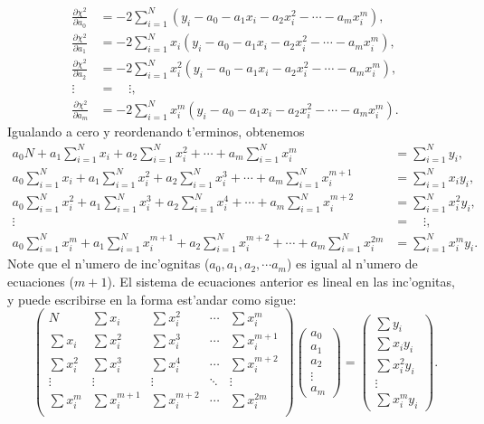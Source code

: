 \documentclass[a4paper]{report}
\begin{document}
\begin{align}
\frac{\partial\chi^2}{\partial a_0} &= -2\sum_{i=1}^N \left(y_i-a_0-a_1x_i-a_2x_i^2-\cdots -a_mx_i^m\right) ,\\
\frac{\partial\chi^2}{\partial a_1} &= -2\sum_{i=1}^N x_i\left(y_i-a_0-a_1x_i-a_2x_i^2-\cdots -a_mx_i^m\right) ,\\
\frac{\partial\chi^2}{\partial a_2} &= -2\sum_{i=1}^N x_i^2\left(y_i-a_0-a_1x_i-a_2x_i^2-\cdots -a_mx_i^m\right) ,\\
\vdots \quad &= \quad \vdots , \\
\frac{\partial\chi^2}{\partial a_m} &= -2\sum_{i=1}^N x_i^m\left(y_i-a_0-a_1x_i-a_2x_i^2-\cdots -a_mx_i^m\right).
\end{align}
Igualando a cero y reordenando t'erminos, obtenemos
\begin{align}
a_0 N + a_1\sum_{i=1}^N x_i +a_2 \sum_{i=1}^N x_i^2 + \cdots + a_m \sum_{i=1}^N x_i^m &= \sum_{i=1}^N y_i, \\
a_0 \sum_{i=1}^N x_i + a_1\sum_{i=1}^N x_i^2 +a_2 \sum_{i=1}^N x_i^3 + \cdots + a_m \sum_{i=1}^N x_i^{m+1} &= \sum_{i=1}^N x_iy_i, \\
a_0 \sum_{i=1}^N x_i^2 + a_1\sum_{i=1}^N x_i^3 +a_2 \sum_{i=1}^N x_i^4 + \cdots + a_m \sum_{i=1}^N x_i^{m+2} &= \sum_{i=1}^N x_i^2y_i, \\
\vdots\quad &= \quad \vdots, \\
a_0 \sum_{i=1}^N x_i^m + a_1\sum_{i=1}^N x_i^{m+1} +a_2 \sum_{i=1}^N x_i^{m+2} + \cdots + a_m \sum_{i=1}^N x_i^{2m} &= \sum_{i=1}^N x_i^my_i.
\end{align}
Note que el n'umero de inc'ognitas ($a_0, a_1, a_2,\cdots a_m$) es igual al n'umero de ecuaciones ($m+1$). El sistema de ecuaciones anterior es lineal en las inc'ognitas, y puede escribirse en la forma est'andar como sigue:
\begin{equation}
\left(\begin{array}{ccccc}
N & \sum x_i &  \sum x_i^2 & \cdots & \sum x_i^m \\
\sum x_i &  \sum x_i^2 &  \sum x_i^3 & \cdots & \sum x_i^{m+1} \\
\sum x^2_i &  \sum x_i^3 &  \sum x_i^4 & \cdots & \sum x_i^{m+2} \\
\vdots & \vdots & \vdots & \ddots & \vdots \\
\sum x_i^m &  \sum x_i^{m+1}&  \sum x_i^{m+2} & \cdots & \sum x_i^{2m} \\
\end{array}
\right)\left(\begin{array}{c}a_0\\a_1\\a_2\\ \vdots\\a_m\end{array}\right)
=\left(\begin{array}{c}
\sum y_i\\ \sum x_iy_i\\ \sum x_i^2y_i\\ \vdots\\ \sum x_i^m y_i\end{array}\right).
\end{equation}
\end{document}
